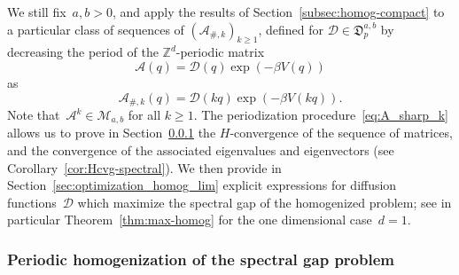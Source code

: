 \documentclass{article}
\renewcommand{\geq}{\geqslant}
\newcommand{\A}{\mathcal{A}}
\newcommand{\Diff}{\mathcal{D}}
\newcommand{\Diffset}{\mathfrak{D}}
\renewcommand{\dim}{d}
\begin{document}
We still fix~$a,b>0$, and apply the results of Section~\ref{subsec:homog-compact} to a particular class of sequences of $(\A_{\#,k})_{k\geq 1}$, defined for $\Diff\in\Diffset_p^{a,b}$ by decreasing the period of the $\mathbb{Z}^\dim$-periodic matrix
\begin{equation}
  \label{eq:def_A_from_D}
  \A(q) = \Diff(q) \exp(-\beta V(q))
\end{equation}
as
\begin{equation}
  \label{eq:A_sharp_k}
  \A_{\#,k}(q) = \Diff(kq)\exp(-\beta V(kq)).
\end{equation}
Note that~$\mathcal{A}^k\in\mathcal{M}_{a,b}$ for all $k\geq 1$.
The periodization procedure~\eqref{eq:A_sharp_k} allows us to prove in Section~\ref{sec:periodic_homog_on_A} the $H$-convergence of the sequence of matrices, and the convergence of the associated eigenvalues and eigenvectors (see Corollary~\ref{cor:Hcvg-spectral}). We then provide in Section~\ref{sec:optimization_homog_lim} explicit expressions for diffusion functions~$\Diff$ which maximize the spectral gap of the homogenized problem; see in particular Theorem~\ref{thm:max-homog} for the one dimensional case~$\dim = 1$. 

\subsubsection{Periodic homogenization of the spectral gap problem}
\label{sec:periodic_homog_on_A}
\end{document}

